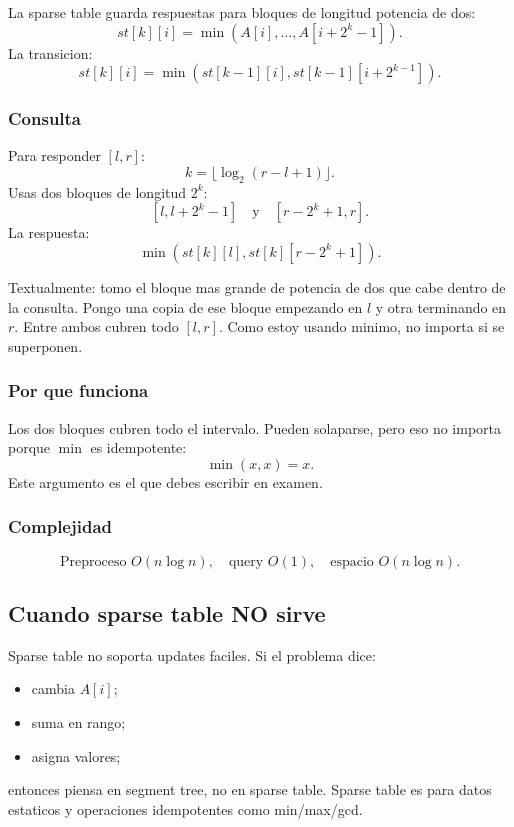 \documentclass[10pt]{article}
\newcommand{\bigO}{O}
\begin{document}
La sparse table guarda respuestas para bloques de longitud potencia de dos:
\[
st[k][i]=\min(A[i],\ldots,A[i+2^k-1]).
\]
La transicion:
\[
st[k][i]=\min(st[k-1][i], st[k-1][i+2^{k-1}]).
\]

\subsubsection*{Consulta}
Para responder $[l,r]$:
\[
k=\lfloor \log_2(r-l+1)\rfloor.
\]
Usas dos bloques de longitud $2^k$:
\[
[l,l+2^k-1]\quad\text{y}\quad[r-2^k+1,r].
\]
La respuesta:
\[
\min(st[k][l], st[k][r-2^k+1]).
\]

Textualmente: tomo el bloque mas grande de potencia de dos que cabe dentro de
la consulta. Pongo una copia de ese bloque empezando en $l$ y otra terminando en
$r$. Entre ambos cubren todo $[l,r]$. Como estoy usando minimo, no importa si se
superponen.

\subsubsection*{Por que funciona}
Los dos bloques cubren todo el intervalo. Pueden solaparse, pero eso no importa
porque $\min$ es idempotente:
\[
\min(x,x)=x.
\]
Este argumento es el que debes escribir en examen.

\subsubsection*{Complejidad}
\[
\text{Preproceso } \bigO(n\log n), \quad
\text{query } \bigO(1), \quad
\text{espacio } \bigO(n\log n).
\]

\subsection{Cuando sparse table NO sirve}
Sparse table no soporta updates faciles. Si el problema dice:
\begin{itemize}[leftmargin=*]
\item cambia $A[i]$;
\item suma en rango;
\item asigna valores;
\end{itemize}
entonces piensa en segment tree, no en sparse table. Sparse table es para
datos estaticos y operaciones idempotentes como min/max/gcd.
\end{document}
